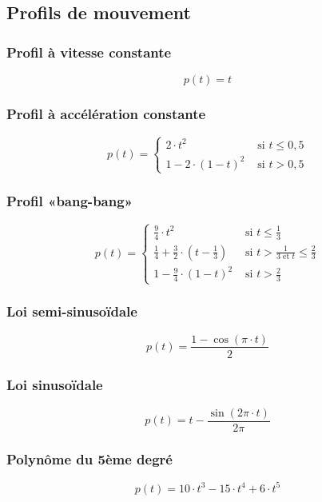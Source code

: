 \documentclass[10pt]{article} %
\begin{document}
\begin{multicols}{3}
\begin{flushleft}
		
		\subsection*{Profils de mouvement}
			
			\subsubsection*{Profil à vitesse constante}
				
				\[p(t)=t\]
				
			\subsubsection*{Profil à accélération constante}
				
				\[
				p(t)=\left\{\begin{array}{ll}
				2 \cdot t^{2} & \text { si } t \leq 0,5 \\
				1-2 \cdot(1-t)^{2} & \text { si } t>0,5
				\end{array}\right.
				\]
				
			\subsubsection*{Profil «bang-bang»}
			
				\[
				p(t)=\left\{\begin{array}{cc}
				\frac{9}{4} \cdot t^{2} & \text { si } t \leq \frac{1}{3} \\
				\frac{1}{4}+\frac{3}{2} \cdot\left(t-\frac{1}{3}\right) & \text { si } t>\frac{1}{3 \text { et } t} \leq \frac{2}{3} \\
				1-\frac{9}{4} \cdot(1-t)^{2} & \text { si } t>\frac{2}{3}
				\end{array}\right.
				\]
				
			\subsubsection*{Loi semi-sinusoïdale}
				
				\[p(t)=\frac{1-\cos (\pi \cdot t)}{2}\]
				
			\subsubsection*{Loi sinusoïdale}
				
				\[p(t)=t-\frac{\sin (2 \pi \cdot t)}{2 \pi}\]
				
			\subsubsection*{Polynôme du 5ème degré}
			
				\[p(t)=10 \cdot t^{3}-15 \cdot t^{4}+6 \cdot t^{5}\]
	
	\end{flushleft}
	\end{multicols}
\end{document}
